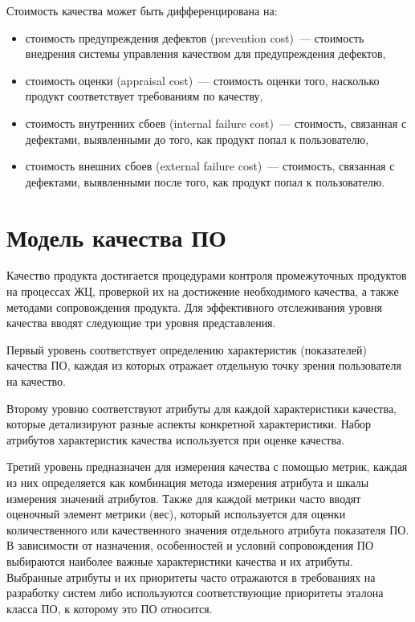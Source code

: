 \documentclass{../../text-style}
\begin{document}
Стоимость качества может быть дифференцирована на:

\begin{itemize}
    \item стоимость предупреждения дефектов (prevention cost)~--- стоимость внедрения системы управления качеством для предупреждения дефектов,
    \item стоимость оценки (appraisal cost)~--- стоимость оценки того, насколько продукт соответствует требованиям по качеству,
    \item стоимость внутренних сбоев (internal failure cost)~--- стоимость, связанная с дефектами, выявленными до того, как продукт попал к пользователю,
    \item стоимость внешних сбоев (external failure cost)~--- стоимость, связанная с дефектами, выявленными после того, как продукт попал к пользователю.
\end{itemize}

\section{Модель качества ПО}

Качество продукта достигается процедурами контроля промежуточных продуктов на процессах ЖЦ, проверкой их на достижение необходимого качества, а также методами сопровождения продукта. Для эффективного отслеживания уровня качества вводят следующие три уровня представления.

Первый уровень соответствует определению характеристик (показателей) качества ПО, каждая из которых отражает отдельную точку зрения пользователя на качество. 

Второму уровню соответствуют атрибуты для каждой характеристики качества, которые детализируют разные аспекты конкретной характеристики. Набор атрибутов характеристик качества используется при оценке качества.

Третий уровень предназначен для измерения качества с помощью метрик, каждая из них определяется как комбинация метода измерения атрибута и шкалы измерения значений атрибутов. Также для каждой метрики часто вводят оценочный элемент метрики (вес), который используется для оценки количественного или качественного значения отдельного атрибута показателя ПО. В зависимости от назначения, особенностей и условий сопровождения ПО выбираются наиболее важные характеристики качества и их атрибуты. Выбранные атрибуты и их приоритеты часто отражаются в требованиях на разработку систем либо используются соответствующие приоритеты эталона класса ПО, к которому это ПО относится.
\end{document}
